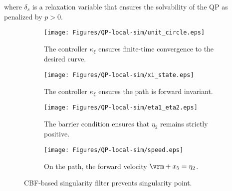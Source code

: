 where $\delta_s$ is a relaxation variable that ensures the solvability of the QP as penalized by $p>0$. 
\begin{figure}[t]
 \centering
 \begin{subfigure}{0.45\columnwidth}
    \centering
    \texttt{[image: Figures/QP-local-sim/unit\_circle.eps]}
    \caption{The controller $\kappa_{\xi}$ ensures finite-time convergence to the desired curve.}
    \label{fig:local-xy-position}
 \end{subfigure}
 \begin{subfigure}{0.45\columnwidth}
    \centering
    \texttt{[image: Figures/QP-local-sim/xi\_state.eps]}
    \caption{The controller $\kappa_{\xi}$ ensures the path is forward invariant.}
    \label{fig:local-xi-states}
 \end{subfigure}
 \label{fig:sim}
 \centering
 \begin{subfigure}{0.45\columnwidth}
    \centering
    \texttt{[image: Figures/QP-local-sim/eta1\_eta2.eps]}
    \caption{The barrier condition ensures that $\eta_2$ remains strictly positive.}
    \label{fig:local-eta1-eta2}
 \end{subfigure}
 \begin{subfigure}{0.45\columnwidth}
    \centering
    \texttt{[image: Figures/QP-local-sim/speed.eps]}
    \caption{On the path, the forward velocity $\vrm + x_5 = \eta_2$.}
    \label{fig:local-speed}
 \end{subfigure}
 \caption{CBF-based singularity filter prevents singularity point.}
 \label{fig:sim}
  \vspace{-0.2cm}
 \end{figure}
